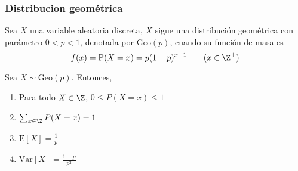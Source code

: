 \subsubsection{Distribucion geométrica}
\begin{Def}
    Sea $X$ una variable aleatoria discreta, $X$ sigue una distribución
    geométrica con parámetro $0<p<1$, denotada por $\text{Geo}(p)$, cuando su
    función de masa es
    \[
        f(x) = \text{P}(X=x)=p(1-p)^{x-1} \qquad (x \in \Z^+)
    \]
\end{Def}
\begin{Teo}
    Sea $X\sim\text{Geo}(p)$. Entonces,
    \begin{enumerate}
        \item Para todo $X\in\Z$, $0\leq P(X=x)\leq1$
        \item $\sum_{x\in\Z}P(X=x)=1$
        \item $\text{E}[X]=\frac{1}{p}$
        \item $\text{Var}[X]=\frac{1-p}{p^2}$
    \end{enumerate}
\end{Teo}
